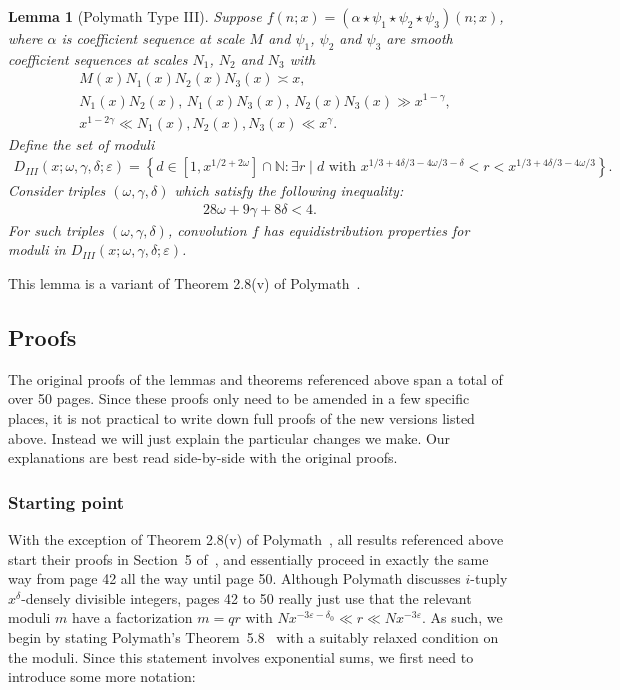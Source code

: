 \documentclass{amsart}
\newtheorem{lemma}{Lemma}
\numberwithin{equation}{section}
\begin{document}
\begin{lemma}[Polymath Type III] \label{lem:typeIII} 
Suppose $f(n;x) = (\alpha \star \psi_1 \star \psi_2 \star \psi_3)(n;x)$, where $\alpha$ is  coefficient sequence at scale $M$ and $\psi_1$, $\psi_2$ and $\psi_3$ are smooth coefficient sequences at scales $N_1$, $N_2$ and $N_3$ with 
\begin{align*}
&M(x) N_1(x) N_2(x) N_3(x) \asymp x, \\
&N_1(x)N_2(x), \, N_1(x)N_3(x), \, N_2(x)N_3(x) \gg x^{1-\gamma}, \\
&x^{1-2\gamma} \ll N_1(x), N_2(x), N_3(x) \ll x^{\gamma}.
\end{align*}
Define the set of moduli
\begin{align*}
D_{III}(x;\omega,\gamma,\delta;\varepsilon) = \left\{d \in  [1, x^{1/2+2\omega}]\cap \mathbb{N}:  \exists r \mid d \mbox{ with } x^{1/3+4\delta/3 -4\omega/3-\delta} < r < x^{1/3+4\delta/3 -4\omega/3} \right\}.
\end{align*}
Consider triples $(\omega,\gamma,\delta)$ which satisfy the following inequality: 
\begin{align*}
28\omega   +9\gamma   +8\delta   <4.
\end{align*}
For such triples  $(\omega,\gamma,\delta)$, convolution $f$ has equidistribution properties for moduli in $D_{III}(x;\omega,\gamma,\delta;\varepsilon)$.
\end{lemma}


This lemma is a variant  of Theorem 2.8(v) of Polymath~\cite{Polymath:2014:EDZ}.

\subsection{Proofs} The original proofs of the lemmas and theorems referenced above span a total of over 50 pages. Since these proofs only need to be amended in a few specific places, it is not practical to write down full proofs of the new versions listed above. Instead  we will just explain the particular changes we make. Our explanations are best read side-by-side with the original proofs. 

\subsubsection{Starting point} With the exception of Theorem 2.8(v) of Polymath~\cite{Polymath:2014:EDZ}, all results referenced above start their proofs in Section~5 of~\cite{Polymath:2014:EDZ}, and essentially proceed in exactly the same way from page 42 all the way until page 50. Although Polymath discusses $i$-tuply $x^\delta$-densely divisible integers, pages 42 to 50 really just use that the relevant moduli $m$  have a factorization $m=qr$ with $Nx^{-3\varepsilon-\delta_0} \ll r \ll Nx^{ -3\varepsilon}$. As such, we begin by stating Polymath's Theorem~5.8~\cite{Polymath:2014:EDZ} with a suitably relaxed condition on the moduli. Since this statement involves exponential sums, we first need to introduce some more notation:
\end{document}
